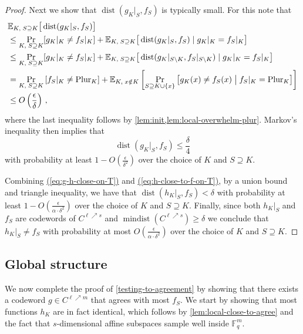 \documentclass[11pt]{article}
\numberwithin{equation}{section}
\theoremstyle{definition}
\theoremstyle{plain}
\renewcommand{\eqref}[1]{\hyperref[#1]{(\ref*{#1})}}
\theoremstyle{plain}
\DeclareMathOperator{\dist}{dist} %
\DeclareMathOperator{\mindist}{mindist}  %
\newcommand{\E}{{\mathbb{E}}}
\newcommand{\F}{{\mathbb{F}}}
\newcommand{\pl}{{\rm{Plur}}}
\begin{document}
\begin{proof}
Next we show that $\dist(g_K|_S, f_S)$ is  typically small.
For this note that
\begin{align}\label{eq:h-close-to-f-on-T}
\nonumber &  \E_{K,\;S \supseteq K}\big[\dist(g_{K}|_S,f_{S})\big] \\
 \nonumber  & \leq \Pr_{K,\;S \supseteq K}[ g_K|_K \neq f_S|_K]+   \E_{K,\;S \supseteq K}\big[\dist(g_{K}|_S,f_{S}) \mid g_K|_K = f_S|_K\big] \\
  \nonumber  & \leq \Pr_{K,\;S \supseteq K}[ g_K|_K \neq f_S|_K]+   \E_{K,\;S \supseteq K}\big[\dist(g_{K}|_{S\setminus K},f_{S}|_{S\setminus K}) \mid g_K|_K = f_S|_K\big] \\
  \nonumber & =  \Pr_{K,\;S \supseteq K} \left[f_S|_K \neq \pl_K \right]+\mathbb{E}_{K,\; x \notin K} \left[\Pr_{S \supseteq K \cup \{x\}} \big[g_K(x) \neq f_S(x) \bigm| f_S|_K = \pl_K \big] \right]  \\
& \leq   O\left( \frac{\epsilon} { \delta}\right)\,,
\end{align}
where the last inequality follows by  \cref{lem:init,lem:local-overwhelm-plur}. Markov's inequality then implies that 
\begin{equation}\label{eq:g-close-to-f-on-T}
 \dist(g_{K}|_S,f_S) \leq \frac{\delta} {4} 
 \end{equation}
 with probability at least $1- O\left(\frac{\epsilon} {\delta^2}\right)$ over the choice of  $K$ and $S \supseteq K$. 
 

Combining \eqref{eq:g-h-close-on-T} and \eqref{eq:h-close-to-f-on-T}, by a union bound and triangle inequality, we have that
 $\dist(h_{K}|_S,f_S) < \delta$ with probability at least $1- O\left(\frac{\epsilon} {\alpha \cdot \delta^2}\right)$ over the choice of  $K$ and $S \supseteq K$. 
Finally, since both $h_K|_{S}$ and $f_{S}$ are codewords of $C^{\ell \nearrow s}$ and $\mindist(C^{\ell \nearrow s}) \geq \delta$ we conclude that  $h_K|_{S} \neq f_{S}$ with probability at most $O\left(\frac{\epsilon} {\alpha \cdot \delta^2}\right)$  over the choice of $K$ and $S \supseteq K$.
\end{proof}


\subsection{Global structure}\label{subsec:global-struct}

We now complete the proof of \cref{testing-to-agreement} by showing that there exists a codeword $g \in C^{\ell \nearrow m}$ that agrees with most $f_S$. We start by showing that most functions $h_K$ are in fact identical, which follows by
\cref{lem:local-close-to-agree} and the fact that $s$-dimensional affine subspaces sample well inside $\F_q^m$.
\end{document}
